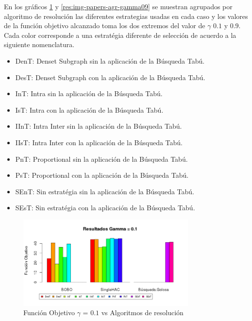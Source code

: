 En los gráficos \ref{res:img-papers-agr-gamma01} y \ref{res:img-papers-agr-gamma09} se muestran agrupados por algoritmo de resolución las diferentes estrategias usadas en cada caso y los valores de la función objetivo alcanzado toma los dos extremos del valor de $\gamma$ $0.1$ y $0.9$. Cada color corresponde a una estratégia diferente de selección de acuerdo a la siguiente nomenclatura.
\begin{itemize}
 \item DenT: Denset Subgraph sin la aplicación de la Búsqueda Tabú.
 \item DesT: Denset Subgraph con la aplicación de la Búsqueda Tabú.
 \item InT: Intra sin la aplicación de la Búsqueda Tabú.
 \item IsT: Intra con la aplicación de la Búsqueda Tabú.
 \item IInT: Intra Inter sin la aplicación de la Búsqueda Tabú.
 \item IIsT: Intra Inter con la aplicación de la Búsqueda Tabú.
 \item PnT: Proportional sin la aplicación de la Búsqueda Tabú.
 \item PsT: Proportional con la aplicación de la Búsqueda Tabú.
 \item SEnT: Sin estratégia sin la aplicación de la Búsqueda Tabú.
 \item SEsT: Sin estratégia con la aplicación de la Búsqueda Tabú.
\end{itemize}

\begin{figure}[H]
  \centering
    \includegraphics[width=0.8\textwidth]{resultados/papers/Graficos_agrupados/gamma01.png}
  \caption{Función Objetivo $\gamma$ = $0.1$ vs Algoritmos de resolución}
  \label{res:img-papers-agr-gamma01}
\end{figure}

